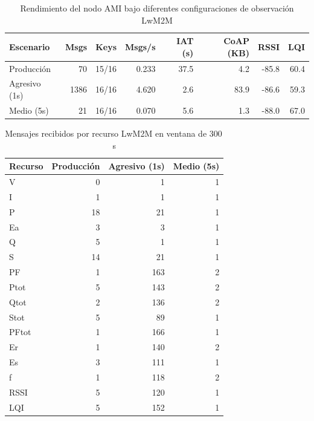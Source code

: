 \begin{table}[htbp]
\centering
\caption{Rendimiento del nodo AMI bajo diferentes configuraciones de observación LwM2M}
\label{tab:benchmark-aggregate}
\footnotesize
\begin{tabular}{lrrrrrrr}
\toprule
\textbf{Escenario} & \textbf{Msgs} & \textbf{Keys} & \textbf{Msgs/s} & \textbf{IAT (s)} & \textbf{CoAP (KB)} & \textbf{RSSI} & \textbf{LQI} \\
\midrule
Producción & 70 & 15/16 & 0.233 & 37.5 & 4.2 & -85.8 & 60.4 \\
Agresivo \textrm{(1s)} & 1386 & 16/16 & 4.620 & 2.6 & 83.9 & -86.6 & 59.3 \\
Medio \textrm{(5s)} & 21 & 16/16 & 0.070 & 5.6 & 1.3 & -88.0 & 67.0 \\
\bottomrule
\end{tabular}
\end{table}

\begin{table}[htbp]
\centering
\caption{Mensajes recibidos por recurso LwM2M en ventana de 300\,s}
\label{tab:benchmark-per-key}
\footnotesize
\begin{tabular}{lrrr}
\toprule
\textbf{Recurso} & \textbf{Producción} & \textbf{Agresivo (1s)} & \textbf{Medio (5s)} \\
\midrule
V & 0 & 1 & 1 \\
I & 1 & 1 & 1 \\
P & 18 & 21 & 1 \\
Ea & 3 & 3 & 1 \\
Q & 5 & 1 & 1 \\
S & 14 & 21 & 1 \\
PF & 1 & 163 & 2 \\
Ptot & 5 & 143 & 2 \\
Qtot & 2 & 136 & 2 \\
Stot & 5 & 89 & 1 \\
PFtot & 1 & 166 & 1 \\
Er & 1 & 140 & 2 \\
Es & 3 & 111 & 1 \\
f & 1 & 118 & 2 \\
RSSI & 5 & 120 & 1 \\
LQI & 5 & 152 & 1 \\
\bottomrule
\end{tabular}
\end{table}